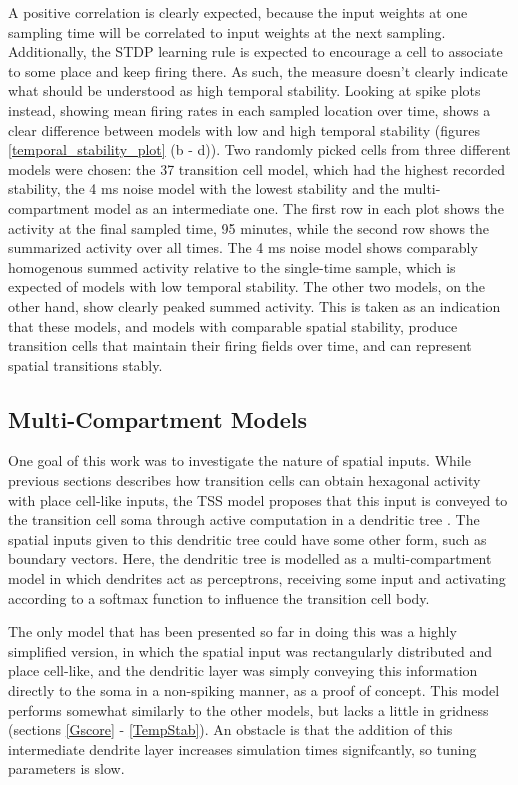 \documentclass{article}
\begin{document}
    A positive correlation is clearly expected, because the input weights at one sampling time will be correlated to input weights at the next sampling. Additionally, the STDP learning rule is expected to encourage a cell to associate to some place and keep firing there. As such, the measure doesn't clearly indicate what should be understood as high temporal stability. Looking at spike plots instead, showing mean firing rates in each sampled location over time, shows a clear difference between models with low and high temporal stability (figures \ref{temporal_stability_plot} (b - d)). Two randomly picked cells from three different models were chosen: the 37 transition cell model, which had the highest recorded stability, the 4 ms noise model with the lowest stability and the multi-compartment model as an intermediate one. The first row in each plot shows the activity at the final sampled time, 95 minutes, while the second row shows the summarized activity over all times. The 4 ms noise model shows comparably homogenous summed activity relative to the single-time sample, which is expected of models with low temporal stability. The other two models, on the other hand, show clearly peaked summed activity. This is taken as an indication that these models, and models with comparable spatial stability, produce transition cells that maintain their firing fields over time, and can represent spatial transitions stably.


    \subsection{Multi-Compartment Models} \label{MCModResult}
    One goal of this work was to investigate the nature of spatial inputs. While previous sections describes how transition cells can obtain hexagonal activity with place cell-like inputs, the TSS model proposes that this input is conveyed to the transition cell soma through active computation in a dendritic tree \parencite{Waniek2020}. The spatial inputs given to this dendritic tree could have some other form, such as boundary vectors. Here, the dendritic tree is modelled as a multi-compartment model in which dendrites act as perceptrons, receiving some input and activating according to a softmax function to influence the transition cell body.

    The only model that has been presented so far in doing this was a highly simplified version, in which the spatial input was rectangularly distributed and place cell-like, and the dendritic layer was simply conveying this information directly to the soma in a non-spiking manner, as a proof of concept. This model performs somewhat similarly to the other models, but lacks a little in gridness (sections \ref{Gscore} - \ref{TempStab}). An obstacle is that the addition of this intermediate dendrite layer increases simulation times signifcantly, so tuning parameters is slow.
\end{document}
